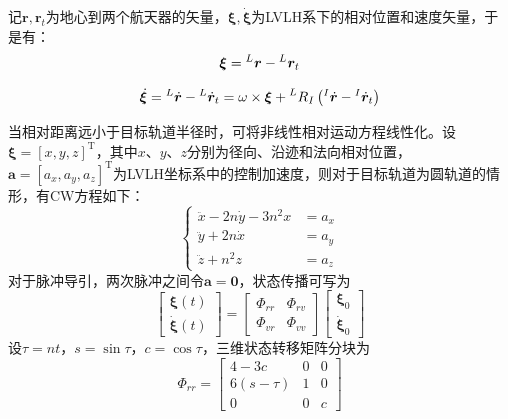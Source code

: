 \documentclass[10.5pt,twocolumn]{aaas}
\begin{document}
记$\boldsymbol{r},\boldsymbol{r}_t$为地心到两个航天器的矢量，$\boldsymbol{\xi},\dot{\boldsymbol{\xi}}$为LVLH系下的相对位置和速度矢量，于是有：
\begin{equation}
  \boldsymbol{\xi} = \prescript{L}{}{\boldsymbol{r}} - \prescript{L}{}{\boldsymbol{r}_t}
\end{equation}

\begin{equation}
  \dot{\boldsymbol{\xi}} = \prescript{L}{}{\dot{\boldsymbol{r}}} - \prescript{L}{}{\dot{\boldsymbol{r}}_t}
  = \omega \times \boldsymbol{\xi} + \prescript{L}{}{R}_{I} \left(\prescript{I}{}{\dot{\boldsymbol{r}}} - \prescript{I}{}{\dot{\boldsymbol{r}}_t}\right)
\end{equation}

当相对距离远小于目标轨道半径时，可将非线性相对运动方程线性化。设$\boldsymbol{\xi}=[x,y,z]^\mathrm{T}$，其中$x$、$y$、$z$分别为径向、沿迹和法向相对位置，$\boldsymbol{a}=[a_x,a_y,a_z]^\mathrm{T}$为LVLH坐标系中的控制加速度，则对于目标轨道为圆轨道的情形，有CW方程如下：
\begin{equation}
  \left\{
  \begin{aligned}
    \ddot x-2n\dot y-3n^2x & =a_x \\
    \ddot y+2n\dot x       & =a_y \\
    \ddot z+n^2z           & =a_z
  \end{aligned}
  \right.
\end{equation}
对于脉冲导引，两次脉冲之间令$\boldsymbol{a}=\boldsymbol{0}$，状态传播可写为
\begin{equation}
  \begin{bmatrix}
    \boldsymbol{\xi}(t) \\
    \dot{\boldsymbol{\xi}}(t)
  \end{bmatrix}
  =
  \begin{bmatrix}
    \Phi_{rr} & \Phi_{rv} \\
    \Phi_{vr} & \Phi_{vv}
  \end{bmatrix}
  \begin{bmatrix}
    \boldsymbol{\xi}_0 \\
    \dot{\boldsymbol{\xi}}_0
  \end{bmatrix}
\end{equation}
设$\tau=nt$，$s=\sin\tau$，$c=\cos\tau$，三维状态转移矩阵分块为
\begin{equation}
  \Phi_{rr}=
  \begin{bmatrix}
    4-3c      & 0 & 0 \\
    6(s-\tau) & 1 & 0 \\
    0         & 0 & c
  \end{bmatrix}
\end{equation}
\end{document}
